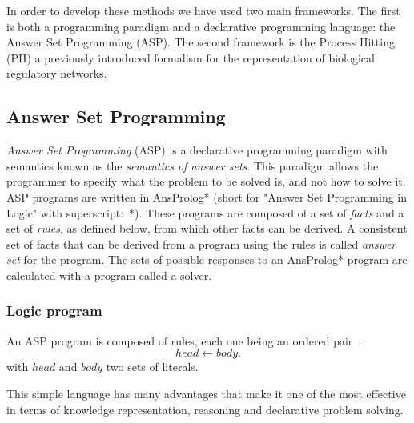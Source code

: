 In order to develop these methods we have used two main frameworks. The first is both a programming paradigm and a declarative programming language: the Answer Set Programming (ASP).
The second framework is the Process Hitting (PH) a previously introduced formalism for the representation of biological regulatory networks.

\subsection{Answer Set Programming }

\emph{Answer Set Programming} (ASP) is a declarative programming paradigm with semantics known as the \emph{semantics of answer sets}.
This paradigm allows the programmer to specify what the problem to be solved is, and not how to solve it.
ASP programs are written in AnsProlog* (short for "Answer Set Programming in Logic" with superscript:~*).
These programs are composed of a set of \emph{facts} and a set of \emph{rules}, as defined below, from which other facts can be derived.
A consistent set of facts that can be derived from a program using the rules is called \emph{answer set} for the program.
The sets of possible responses to an AnsProlog* program are calculated with a program called a solver.

\subsubsection{Logic program}
An ASP program is composed of rules, each one being an ordered pair~\cite{baral2003knowledge}:
\begin{equation} \label{eq1ASP}
head \leftarrow body.
\end{equation}
with $head$ and $body$ two sets of literals. 

This simple language has many advantages that make it one of the most effective in terms of knowledge representation, reasoning and declarative problem solving. 

